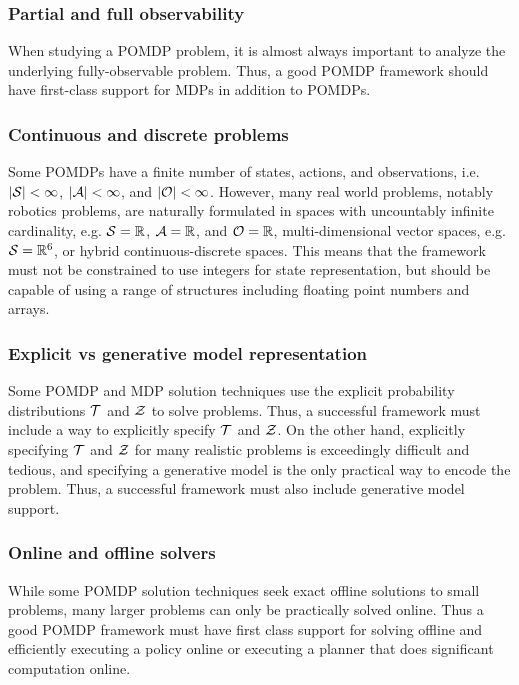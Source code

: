 \subsubsection{Partial and full observability}

When studying a POMDP problem, it is almost always important to analyze the underlying fully-observable problem.
Thus, a good POMDP framework should have first-class support for MDPs in addition to POMDPs.

\subsubsection{Continuous and discrete problems}

Some POMDPs have a finite number of states, actions, and observations, i.e. $|\mathcal{S}| < \infty$, $|\mathcal{A}| < \infty$, and $|\mathcal{O}| < \infty$.
However, many real world problems, notably robotics problems, are naturally formulated in spaces with uncountably infinite cardinality, e.g. $\mathcal{S} = \mathbb{R}$, $\mathcal{A} = \mathbb{R}$, and $\mathcal{O} = \mathbb{R}$, multi-dimensional vector spaces, e.g. $\mathcal{S} = \mathbb{R}^6$, or hybrid continuous-discrete spaces.
This means that the framework must not be constrained to use integers for state representation, but should be capable of using a range of structures including floating point numbers and arrays.

\subsubsection{Explicit vs generative model representation}

Some POMDP and MDP solution techniques use the explicit probability distributions $\mathcal{T}$ and $\mathcal{Z}$ to solve problems.
Thus, a successful framework must include a way to explicitly specify $\mathcal{T}$ and $\mathcal{Z}$.
On the other hand, explicitly specifying $\mathcal{T}$ and $\mathcal{Z}$ for many realistic problems is exceedingly difficult and tedious, and specifying a generative model is the only practical way to encode the problem.
Thus, a successful framework must also include generative model support.

\subsubsection{Online and offline solvers}

While some POMDP solution techniques seek exact offline solutions to small problems, many larger problems can only be practically solved online.
Thus a good POMDP framework must have first class support for solving offline and efficiently executing a policy online or executing a planner that does significant computation online.

